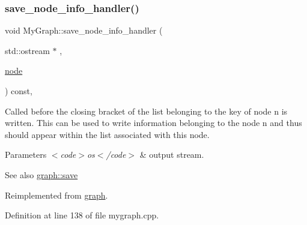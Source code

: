 \subsubsection{\texorpdfstring{save\+\_\+node\+\_\+info\+\_\+handler()}{save\_node\_info\_handler()}}
{\footnotesize\ttfamily void My\+Graph\+::save\+\_\+node\+\_\+info\+\_\+handler (\begin{DoxyParamCaption}\item[{std\+::ostream $\ast$}]{,  }\item[{\mbox{\hyperlink{classnode}{node}}}]{ }\end{DoxyParamCaption}) const\hspace{0.3cm}{\ttfamily [virtual]}, {\ttfamily [inherited]}}

Called before the closing bracket of the list belonging to the key of node {\ttfamily n} is written. This can be used to write information belonging to the node {\ttfamily n} and thus should appear within the list associated with this node.


\begin{DoxyParams}{Parameters}
{\em $<$code$>$os$<$/code$>$} & output stream. \\
\hline
\end{DoxyParams}
\begin{DoxySeeAlso}{See also}
\mbox{\hyperlink{classgraph_a7bd0712a528249d1585085a64ac3e661}{graph\+::save}} 
\end{DoxySeeAlso}


Reimplemented from \mbox{\hyperlink{classgraph_a994f87e1b7f1f723cf03e54e2eb7a99d}{graph}}.



Definition at line 138 of file mygraph.\+cpp.


